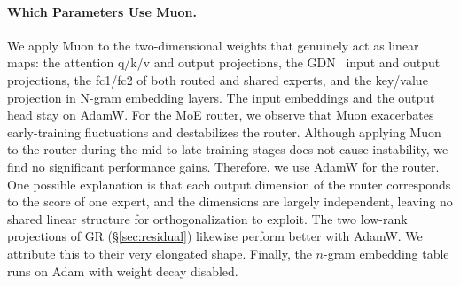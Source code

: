 \paragraph{Which Parameters Use Muon.}
\label{sec:optimizer-assignment}


We apply Muon to the two-dimensional weights that genuinely act as linear maps: the attention q/k/v and output projections, the GDN~\citep{yang2024gated} input and output projections, the fc1/fc2 of both routed and shared experts, and the key/value projection in N-gram embedding layers.
The input embeddings and the output head stay on AdamW.
For the MoE router, we observe that Muon exacerbates early-training fluctuations and destabilizes the router. Although applying Muon to the router during the mid-to-late training stages does not cause instability, we find no significant performance gains. Therefore, we use AdamW for the router.
One possible explanation is that each output dimension of the router corresponds to the score of one expert, and the dimensions are largely independent, leaving no shared linear structure for orthogonalization to exploit.
The two low-rank projections of GR (\S\ref{sec:residual}) likewise perform better with AdamW.
We attribute this to their very elongated shape.
Finally, the $n$-gram embedding table runs on Adam with weight decay disabled.

